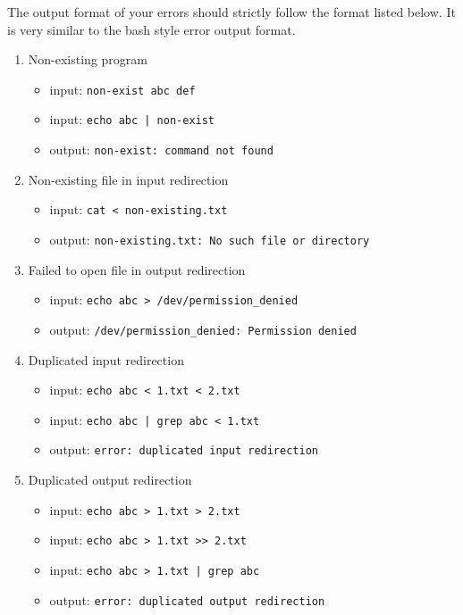 \documentclass[11pt,a4paper]{article}
\begin{document}
The output format of your errors should strictly follow the format listed below. It is very similar to the bash style error output format.

\begin{enumerate}
\item Non-existing program
\begin{itemize}
\item input: \texttt{non-exist abc def}
\item input: \texttt{echo abc | non-exist}
\item output: \texttt{non-exist: command not found}
\end{itemize}
\item Non-existing file in input redirection
\begin{itemize}
\item input: \texttt{cat < non-existing.txt}
\item output: \texttt{non-existing.txt: No such file or directory}
\end{itemize}
\item Failed to open file in output redirection
\begin{itemize}
\item input: \texttt{echo abc > /dev/permission_denied}
\item output: \texttt{/dev/permission_denied: Permission denied}
\end{itemize}
\item Duplicated input redirection
\begin{itemize}
\item input: \texttt{echo abc < 1.txt < 2.txt}
\item input: \texttt{echo abc | grep abc < 1.txt}
\item output: \texttt{error: duplicated input redirection}
\end{itemize}
\item Duplicated output redirection
\begin{itemize}
\item input: \texttt{echo abc > 1.txt > 2.txt}
\item input: \texttt{echo abc > 1.txt >> 2.txt}
\item input: \texttt{echo abc > 1.txt | grep abc}
\item output: \texttt{error: duplicated output redirection}
\end{itemize}

\end{enumerate}
\end{document}
